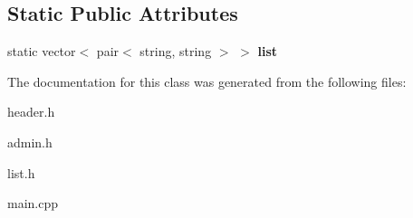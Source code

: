 \subsection*{Static Public Attributes}
\begin{DoxyCompactItemize}
\item 
\mbox{\label{classvocabulary_a53aac1c67f229a5bafbdc8bb515c7aed}} 
static vector$<$ pair$<$ string, string $>$ $>$ {\bfseries list}
\end{DoxyCompactItemize}


The documentation for this class was generated from the following files\+:\begin{DoxyCompactItemize}
\item 
header.\+h\item 
admin.\+h\item 
list.\+h\item 
main.\+cpp\end{DoxyCompactItemize}
